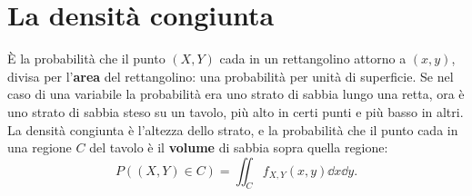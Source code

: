 \section{La densità congiunta}


È la probabilità che il punto $(X, Y)$ cada in un rettangolino attorno a $(x, y)$, divisa per l'\textbf{area} del
rettangolino: una probabilità per unità di superficie. Se nel caso di una variabile la probabilità era uno strato di
sabbia lungo una retta, ora è uno strato di sabbia steso su un tavolo, più alto in certi punti e più basso in altri.
La densità congiunta è l'altezza dello strato, e la probabilità che il punto cada in una regione $C$ del tavolo è il
\textbf{volume} di sabbia sopra quella regione:
\[ P\left( (X, Y) \in C \right) = \iint_C f_{X,Y}(x, y) \dd x \dd y . \]

